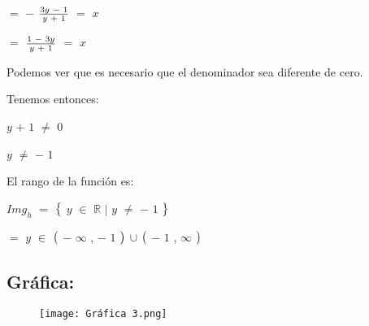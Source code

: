 \documentclass[12pt]{article}
\begin{document}
\hspace{4cm} $=$ $-$ {\LARGE{$\frac{3y \hspace{0.1cm} - \hspace{0.1cm} 1}{y \hspace{0.1cm} + \hspace{0.1cm} 1}$}} $=$ $x$  \vspace{0.5cm}

\hspace{4cm} $=$ {\LARGE{$\frac{1 \hspace{0.1cm} - \hspace{0.1cm} 3y}{y \hspace{0.1cm} + \hspace{0.1cm} 1}$}} $=$ $x$  \vspace{0.5cm}

Podemos ver que es necesario que el denominador sea diferente de cero. \vspace{0.5cm}

Tenemos entonces: \vspace{0.5cm}

\hspace{4.7cm} $y$ $+$ $1$ $\neq$ $0$ \vspace{0.5cm}

\hspace{4.7cm} $y$ $\neq$ $-$ $1$ \vspace{0.5cm}

El rango de la función es: \vspace{0.5cm}

\hspace{4cm} $Img_{h}$ $=$ $\big{\{}$ $y$ $\in$ $\mathbb{R}$ $\mid$  $y$ $\neq$ $-$ $1$ $\big{\}}$ \vspace{0.5cm}

\hspace{8cm} $=$ $y$ $\in$ $\big{(}$ $-$ $\infty$ , $-$ $1$ $\big{)}$ $\cup$ $\big{(}$ $-$ $1$ , $\infty$ $\big{)}$  \vspace{0.5cm}

\subsection*{{\textcolor{Lochinvar}{\bfseries{Gráfica}:}}} \vspace{0.5cm}

\begin{figure}[htb] \centering

    \texttt{[image: Gráfica 3.png]} 

\end{figure} \vspace{0.5cm}
\end{document}

